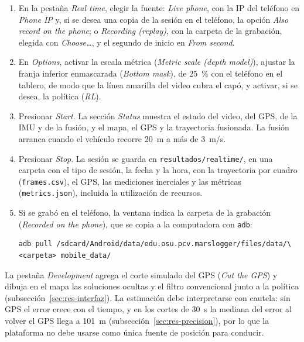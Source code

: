 \begin{enumerate}
\item En la pestaña \textit{Real time}, elegir la fuente: \textit{Live phone}, con la IP del teléfono en \textit{Phone IP} y, si se desea una copia de la sesión en el teléfono, la opción \textit{Also record on the phone}; o \textit{Recording (replay)}, con la carpeta de la grabación, elegida con \textit{Choose\dots}, y el segundo de inicio en \textit{From second}.

\item En \textit{Options}, activar la escala métrica (\textit{Metric scale (depth model)}), ajustar la franja inferior enmascarada (\textit{Bottom mask}), de 25~\% con el teléfono en el tablero, de modo que la línea amarilla del video cubra el capó, y activar, si se desea, la política (\textit{RL}).

\item Presionar \textit{Start}.
La sección \textit{Status} muestra el estado del video, del GPS, de la IMU y de la fusión, y el mapa, el GPS y la trayectoria fusionada.
La fusión arranca cuando el vehículo recorre 20~m a más de 3~m/s.

\item Presionar \textit{Stop}.
La sesión se guarda en \texttt{resultados/realtime/}, en una carpeta con el tipo de sesión, la fecha y la hora, con la trayectoria por cuadro (\texttt{frames.csv}), el GPS, las mediciones inerciales y las métricas (\texttt{metrics.json}), incluida la utilización de recursos.

\item Si se grabó en el teléfono, la ventana indica la carpeta de la grabación (\textit{Recorded on the phone}), que se copia a la computadora con \texttt{adb}:
\begin{small}
\begin{verbatim}
adb pull /sdcard/Android/data/edu.osu.pcv.marslogger/files/data/\
<carpeta> mobile_data/
\end{verbatim}
\end{small}
\end{enumerate}

La pestaña \textit{Development} agrega el corte simulado del GPS (\textit{Cut the GPS}) y dibuja en el mapa las soluciones ocultas y el filtro convencional junto a la política (subsección~\ref{sec:res-interfaz}).
La estimación debe interpretarse con cautela: sin GPS el error crece con el tiempo, y en los cortes de 30~s la mediana del error al volver el GPS llega a 101~m (subsección~\ref{sec:res-precision}), por lo que la plataforma no debe usarse como única fuente de posición para conducir.

